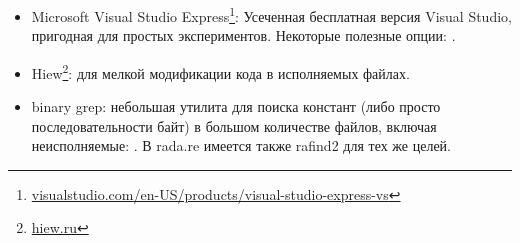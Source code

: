 \begin{itemize}
\item
Microsoft Visual Studio Express\footnote{\href{http://go.yurichev.com/17034}{visualstudio.com/en-US/products/visual-studio-express-vs}}:
Усеченная бесплатная версия Visual Studio, пригодная для простых экспериментов.
Некоторые полезные опции: .

\item
\label{Hiew}
Hiew\footnote{\href{http://go.yurichev.com/17035}{hiew.ru}}:
для мелкой модификации кода в исполняемых файлах.
	
\item
{}
binary grep: 
небольшая утилита для поиска констант (либо просто последовательности байт)
в большом количестве файлов, включая неисполняемые: \BGREPURL.
В rada.re имеется также rafind2 для тех же целей.

\end{itemize}


